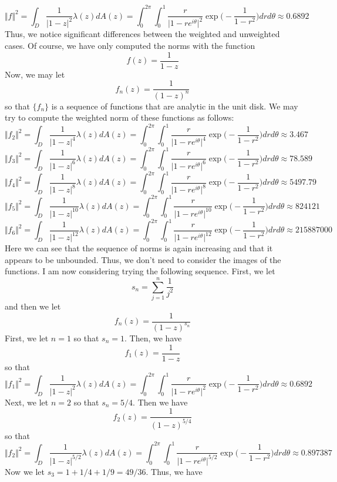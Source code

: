 \documentclass[12pt]{article}
\begin{document}
\[
\Vert f \Vert ^2 = \int_D \frac{1}{\vert 1-z \vert^2} \lambda(z) dA(z) = \int_0^{2\pi} \int_0^1 \frac{r}{\vert 1 - re^{i\theta} \vert^2} \exp\bigg(-\frac{1}{1-r^2}\bigg) dr d\theta \approx 0.6892
\] Thus, we notice significant differences between the weighted and unweighted cases. Of course, we have only computed the norms with the function 
\[
f(z) = \frac{1}{1-z}
\] Now, we may let
\[
f_n(z) = \frac{1}{(1-z)^n}
\] so that $\{f_n\}$ is a sequence of functions that are analytic in the unit disk. We may try to compute the weighted norm of these functions as follows:
\[
\Vert f_2 \Vert^2 = \int_D \frac{1}{\vert 1 - z \vert^4} \lambda(z) dA(z) = \int_0^{2\pi} \int_0^1 \frac{r}{\vert 1 - re^{i\theta} \vert^4} \exp\bigg(-\frac{1}{1-r^2}\bigg) dr d\theta \approx 3.467
\] 
\[
\Vert f_3 \Vert^2 = \int_D \frac{1}{\vert 1 - z \vert^6} \lambda(z) dA(z) = \int_0^{2\pi} \int_0^1 \frac{r}{\vert 1 - re^{i\theta} \vert^6} \exp\bigg(-\frac{1}{1-r^2}\bigg) dr d\theta \approx 78.589
\]
\[
\Vert f_4 \Vert^2 = \int_D \frac{1}{\vert 1 - z \vert^8} \lambda(z) dA(z) = \int_0^{2\pi} \int_0^1 \frac{r}{\vert 1 - re^{i\theta} \vert^8} \exp\bigg(-\frac{1}{1-r^2}\bigg) dr d\theta \approx 5497.79
\]
\[
\Vert f_5 \Vert^2 = \int_D \frac{1}{\vert 1 - z \vert^{10}} \lambda(z) dA(z) = \int_0^{2\pi} \int_0^1 \frac{r}{\vert 1 - re^{i\theta} \vert^{10}} \exp\bigg(-\frac{1}{1-r^2}\bigg) dr d\theta \approx 824121
\]
\[
\Vert f_6 \Vert^2 = \int_D \frac{1}{\vert 1 - z \vert^{12}} \lambda(z) dA(z) = \int_0^{2\pi} \int_0^1 \frac{r}{\vert 1 - re^{i\theta} \vert^{12}} \exp\bigg(-\frac{1}{1-r^2}\bigg) dr d\theta \approx 215887000
\] Here we can see that the sequence of norms is again increasing and that it appears to be unbounded. Thus, we don't need to consider the images of the functions. I am now considering trying the following sequence. First, we let
\[
s_n = \sum_{j=1}^n \frac{1}{j^2}
\] and then we let 
\[
f_n(z) = \frac{1}{(1-z)^{s_n}}
\] First, we let $n = 1$ so that $s_n = 1$. Then, we have
\[
f_1(z) =\frac{1}{1-z}
\] so that
\[
\Vert f_1 \Vert^2 = \int_D \frac{1}{\vert 1 - z \vert^2} \lambda(z) dA(z) = \int_0^{2\pi} \int_0^1 \frac{r}{\vert 1 - re^{i\theta} \vert^2} \exp\bigg(-\frac{1}{1-r^2}\bigg) dr d\theta \approx 0.6892 
\] Next, we let $n = 2$ so that $s_n = 5/4$. Then we have
\[
f_2(z) = \frac{1}{(1-z)^{5/4}}
\] so that
\[
\Vert f_2 \Vert^2 = \int_D \frac{1}{\vert 1- z\vert^{5/2}} \lambda(z) dA(z) = \int_0^{2\pi} \int_0^1 \frac{r}{\vert 1 - re^{i\theta} \vert^{5/2}} \exp\bigg(-\frac{1}{1-r^2}\bigg) dr d\theta \approx 0.897387
\] Now we let $s_3 = 1 + 1/4 + 1/9 = 49/36$. Thus, we have
\end{document}
